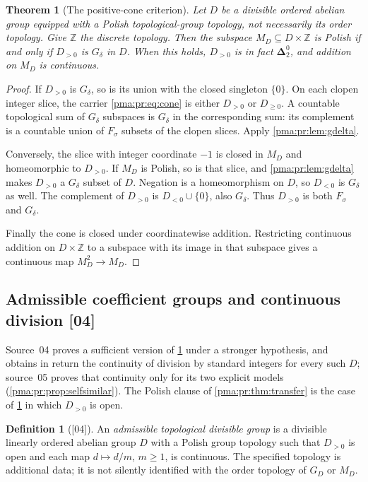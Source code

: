 \documentclass[11pt]{article}
\numberwithin{equation}{section}
\newtheorem{theorem}{Theorem}[section]
\theoremstyle{definition}
\newtheorem{definition}[definition]{Definition}
\theoremstyle{remark}
\newcommand{\Z}{\mathbb Z}
\newcommand{\MD}{M_D}
\newcommand{\Dtwo}{\boldsymbol{\Delta}^{0}_{2}}
\newcommand{\src}[1]{\textup{\textsf{\small[#1]}}}
\begin{document}
\begin{theorem}[The positive-cone criterion]
\label{pma:pr:thm:criterion}
Let $D$ be a divisible ordered abelian group equipped with a Polish
topological-group topology, not necessarily its order topology. Give
$\Z$ the discrete topology. Then the subspace $\MD\subseteq D\times\Z$
is Polish if and only if $D_{>0}$ is $G_\delta$ in $D$. When this holds,
$D_{>0}$ is in fact $\Dtwo$, and addition on $\MD$ is continuous.
\end{theorem}
\begin{proof}
If $D_{>0}$ is $G_\delta$, so is its union with the closed singleton
$\{0\}$. On each clopen integer slice, the carrier \eqref{pma:pr:eq:cone} is
either $D_{>0}$ or $D_{\geq0}$. A countable topological sum of
$G_\delta$ subspaces is $G_\delta$ in the corresponding sum: its
complement is a countable union of $F_\sigma$ subsets of the clopen
slices. Apply \cref{pma:pr:lem:gdelta}.

Conversely, the slice with integer coordinate $-1$ is closed in $\MD$
and homeomorphic to $D_{>0}$. If $\MD$ is Polish, so is that slice, and
\cref{pma:pr:lem:gdelta} makes $D_{>0}$ a $G_\delta$ subset of $D$.
Negation is a homeomorphism on $D$, so $D_{<0}$ is $G_\delta$ as well.
The complement of $D_{>0}$ is $D_{<0}\cup\{0\}$, also $G_\delta$.
Thus $D_{>0}$ is both $F_\sigma$ and $G_\delta$.

Finally the cone is closed under coordinatewise addition. Restricting
continuous addition on $D\times\Z$ to a subspace with its image in that
subspace gives a continuous map $\MD^2\to\MD$.
\end{proof}

\subsection{Admissible coefficient groups and continuous division \src{04}}\label{pma:pr:sec:transfer}

Source~04 proves a sufficient version of \cref{pma:pr:thm:criterion} under a
stronger hypothesis, and obtains in return the continuity of division by
standard integers for every such $D$; source~05 proves that continuity only
for its two explicit models (\cref{pma:pr:prop:selfsimilar}). The Polish
clause of \cref{pma:pr:thm:transfer} is the case of \cref{pma:pr:thm:criterion}
in which $D_{>0}$ is open.

\begin{definition}[\src{04}]
An \emph{admissible topological divisible group} is a divisible linearly
ordered abelian group $D$ with a Polish group topology such that $D_{>0}$ is
open and each map $d\mapsto d/m$, $m\geq1$, is continuous. The specified
topology is additional data; it is not silently identified with the order
topology of $G_D$ or $M_D$.
\end{definition}
\end{document}
